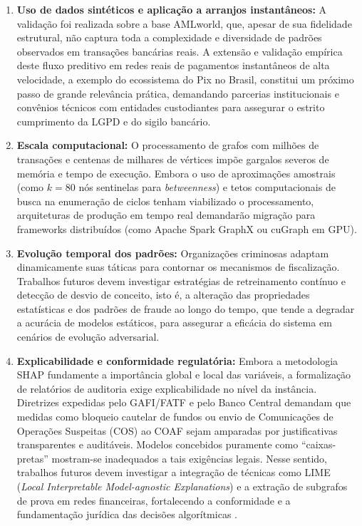 \documentclass[titlepage,a4paper,oneside,onecolumn,12pt]{report}
\begin{document}
\begin{enumerate}
    \item \textbf{Uso de dados sintéticos e aplicação a arranjos instantâneos:} A validação foi realizada sobre a base AMLworld, que, apesar de sua fidelidade estrutural, não captura toda a complexidade e diversidade de padrões observados em transações bancárias reais. A extensão e validação empírica deste fluxo preditivo em redes reais de pagamentos instantâneos de alta velocidade, a exemplo do ecossistema do Pix no Brasil, constitui um próximo passo de grande relevância prática, demandando parcerias institucionais e convênios técnicos com entidades custodiantes para assegurar o estrito cumprimento da LGPD e do sigilo bancário.
    
    \item \textbf{Escala computacional:} O processamento de grafos com milhões de transações e centenas de milhares de vértices impõe gargalos severos de memória e tempo de execução. Embora o uso de aproximações amostrais (como $k=80$ nós sentinelas para \textit{betweenness}) e tetos computacionais de busca na enumeração de ciclos tenham viabilizado o processamento, arquiteturas de produção em tempo real demandarão migração para frameworks distribuídos (como Apache Spark GraphX ou cuGraph em GPU).
    
    \item \textbf{Evolução temporal dos padrões:} Organizações criminosas adaptam dinamicamente suas táticas para contornar os mecanismos de fiscalização. Trabalhos futuros devem investigar estratégias de retreinamento contínuo e detecção de desvio de conceito, isto é, a alteração das propriedades estatísticas e dos padrões de fraude ao longo do tempo, que tende a degradar a acurácia de modelos estáticos, para assegurar a eficácia do sistema em cenários de evolução adversarial.
    
    \item \textbf{Explicabilidade e conformidade regulatória:} Embora a metodologia SHAP fundamente a importância global e local das variáveis, a formalização de relatórios de auditoria exige explicabilidade no nível da instância. Diretrizes expedidas pelo GAFI/FATF e pelo Banco Central demandam que medidas como bloqueio cautelar de fundos ou envio de Comunicações de Operações Suspeitas (COS) ao COAF sejam amparadas por justificativas transparentes e auditáveis. Modelos concebidos puramente como ``caixas-pretas'' mostram-se inadequados a tais exigências legais. Nesse sentido, trabalhos futuros devem investigar a integração de técnicas como LIME (\textit{Local Interpretable Model-agnostic Explanations}) e a extração de subgrafos de prova em redes financeiras, fortalecendo a conformidade e a fundamentação jurídica das decisões algorítmicas \cite{ribeiro2016should}.
\end{enumerate}
\end{document}
